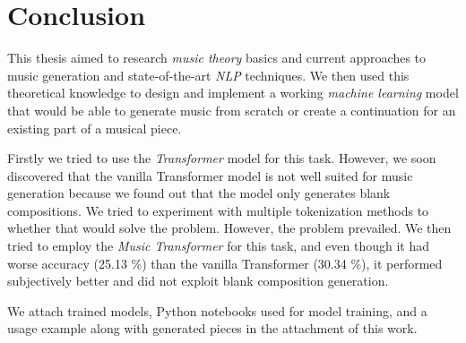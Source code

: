 \chapter{Conclusion}\label{ch:conclusion}

This thesis aimed to research \textit{music theory} basics and current approaches to music generation and state-of-the-art \textit{NLP} techniques.
We then used this theoretical knowledge to design and implement a working \textit{machine learning} model that would be able to generate music from scratch or create a continuation for an existing part of a musical piece.

Firstly we tried to use the \textit{Transformer} model for this task.
However, we soon discovered that the vanilla Transformer model is not well suited for music generation because we found out that the model only generates blank compositions.
We tried to experiment with multiple tokenization methods to whether that would solve the problem.
However, the problem prevailed.
We then tried to employ the \textit{Music Transformer} for this task, and even though it had worse accuracy (25.13 \%) than the vanilla Transformer (30.34 \%), it performed subjectively better and did not exploit blank composition generation.

We attach trained models, Python notebooks used for model training, and a usage example along with generated pieces in the attachment of this work.
